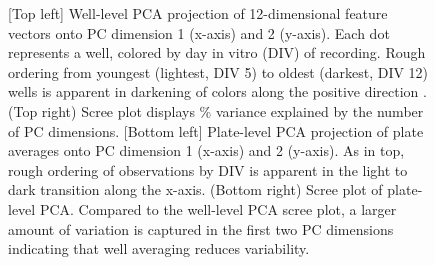 \documentclass{article}
\begin{document}
\begin{figure}
  \centering
  \caption{[Top left] Well-level PCA projection of 12-dimensional
feature vectors onto PC dimension 1 (x-axis) and 2 (y-axis).  Each dot
represents a well, colored by day in vitro (DIV) of recording. Rough
ordering from youngest (lightest, DIV 5) to oldest (darkest, DIV 12)
wells is apparent in darkening of colors along the positive direction
. (Top right) Scree plot displays \% variance explained by the number
of PC dimensions. [Bottom left] Plate-level PCA projection of plate
averages onto PC dimension 1 (x-axis) and 2 (y-axis).  As in top,
rough ordering of observations by DIV is apparent in the light to dark
transition along the x-axis. (Bottom right) Scree plot of plate-level
PCA. Compared to the well-level PCA scree plot, a larger amount of
variation is captured in the first two PC dimensions indicating that
well averaging reduces variability.
}
\end{figure}
\end{document}
